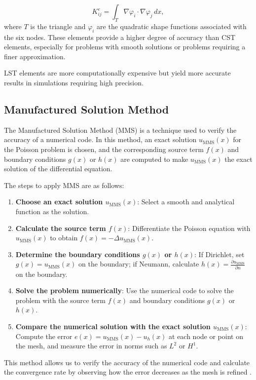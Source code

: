 \[
K^e_{ij} = \int_T \nabla \varphi_i \cdot \nabla \varphi_j \, dx,
\]
where \(T\) is the triangle and \(\varphi_i\) are the quadratic shape functions associated with the six nodes. These elements provide a higher degree of accuracy than CST elements, especially for problems with smooth solutions or problems requiring a finer approximation.

LST elements are more computationally expensive but yield more accurate results in simulations requiring high precision.

\subsection{Manufactured Solution Method}

The Manufactured Solution Method (MMS) is a technique used to verify the accuracy of a numerical code. In this method, an exact solution \(u_{\text{MMS}}(x)\) for the Poisson problem is chosen, and the corresponding source term \(f(x)\) and boundary conditions \(g(x)\) or \(h(x)\) are computed to make \(u_{\text{MMS}}(x)\) the exact solution of the differential equation.

The steps to apply MMS are as follows:

\begin{enumerate}
    \item \textbf{Choose an exact solution \(u_{\text{MMS}}(x)\)}: Select a smooth and analytical function as the solution.
    \item \textbf{Calculate the source term \(f(x)\)}: Differentiate the Poisson equation with \(u_{\text{MMS}}(x)\) to obtain \(f(x) = -\Delta u_{\text{MMS}}(x)\).
    \item \textbf{Determine the boundary conditions \(g(x)\) or \(h(x)\)}: If Dirichlet, set \(g(x) = u_{\text{MMS}}(x)\) on the boundary; if Neumann, calculate \(h(x) = \frac{\partial u_{\text{MMS}}}{\partial n}\) on the boundary.
    \item \textbf{Solve the problem numerically}: Use the numerical code to solve the problem with the source term \(f(x)\) and boundary conditions \(g(x)\) or \(h(x)\).
    \item \textbf{Compare the numerical solution with the exact solution \(u_{\text{MMS}}(x)\)}: Compute the error \(e(x) = u_{\text{MMS}}(x) - u_h(x)\) at each node or point on the mesh, and measure the error in norms such as \(L^2\) or \(H^1\).
\end{enumerate}

This method allows us to verify the accuracy of the numerical code and calculate the convergence rate by observing how the error decreases as the mesh is refined \cite{manufactured_solution_method}.


